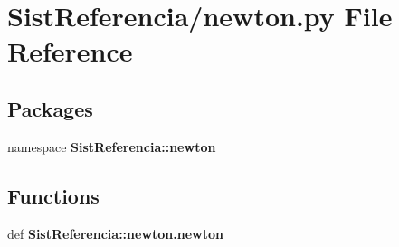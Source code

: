 \section{\-Sist\-Referencia/newton.py \-File \-Reference}
\label{newton_8py}
\subsection*{\-Packages}
\begin{DoxyCompactItemize}
\item 
namespace {\bf \-Sist\-Referencia\-::newton}
\end{DoxyCompactItemize}
\subsection*{\-Functions}
\begin{DoxyCompactItemize}
\item 
def {\bf \-Sist\-Referencia\-::newton.\-newton}
\end{DoxyCompactItemize}
